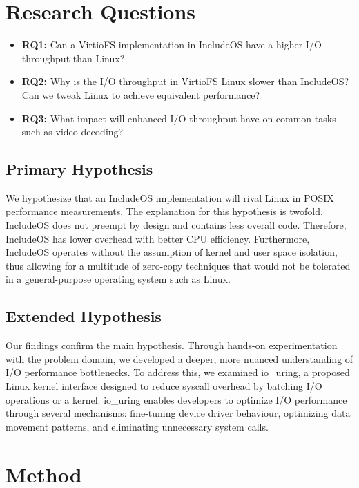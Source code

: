 \documentclass[12pt, a4paper, oneside]{report}
\begin{document}
\section{Research Questions}

\begin{itemize}[leftmargin=1.5em]
  \item \textbf{RQ1:} Can a VirtioFS implementation in IncludeOS have a higher
        I/O throughput than Linux?
  \item \textbf{RQ2:} Why is the I/O throughput in VirtioFS Linux slower than
        IncludeOS?  Can we tweak Linux to achieve equivalent performance?
  \item \textbf{RQ3:} What impact will enhanced I/O throughput have on common
        tasks such as video decoding?
\end{itemize}

\subsection{Primary Hypothesis}

We hypothesize that an IncludeOS implementation will rival Linux in POSIX
performance measurements.  The explanation for this hypothesis is twofold.
IncludeOS does not preempt by design and contains less overall code.  Therefore,
IncludeOS has lower overhead with better CPU efficiency.  Furthermore, IncludeOS
operates without the assumption of kernel and user space isolation, thus allowing
for a multitude of zero-copy techniques that would not be tolerated in a
general-purpose operating system such as Linux.

\subsection{Extended Hypothesis}

Our findings confirm the main hypothesis.  Through hands-on experimentation with
the problem domain, we developed a deeper, more nuanced understanding of I/O
performance bottlenecks.  To address this, we examined io\_uring, a proposed
Linux kernel interface designed to reduce syscall overhead by batching I/O
operations or a kernel.  io\_uring enables developers to optimize I/O performance through several mechanisms: fine-tuning device driver behaviour, optimizing data movement patterns, and eliminating unnecessary system calls.


\section{Method}
\end{document}
